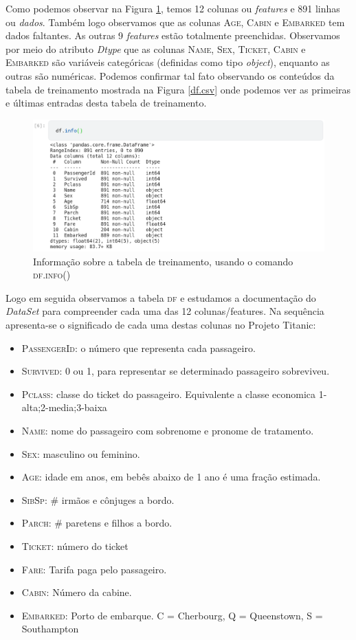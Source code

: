 \documentclass{article}
\begin{document}
Como podemos observar na Figura \ref{df.info}, temos 12 colunas ou \emph{features} e 891 linhas ou \emph{dados}. Também logo observamos que as colunas \textsc{Age, Cabin} e \textsc{Embarked} tem dados faltantes. As outras 9 \emph{features} estão totalmente preenchidas. 
Observamos por meio do atributo \emph{Dtype} que as colunas \textsc{Name, Sex, Ticket, Cabin} e \textsc{Embarked} são variáveis categóricas (definidas como tipo \emph{object}), enquanto as outras são numéricas. Podemos confirmar tal fato observando os conteúdos da tabela de treinamento mostrada na Figura \ref{df.csv} onde podemos ver as primeiras e últimas entradas desta tabela de treinamento.
\begin{figure}[H]
\centering
\includegraphics[width=\textwidth]{Figures/df.info().png}
\caption{\label{df.info}Informação sobre a tabela de treinamento, usando o comando \textsc{df.info()}}
\end{figure}

Logo em seguida observamos a tabela \textsc{df} e estudamos a documentação do \emph{DataSet} para compreender cada uma das 12 colunas/features. Na sequência apresenta-se o significado de cada uma destas colunas no Projeto Titanic:
\begin{itemize}
\item \textsc{PassengerId}: o número que representa cada passageiro. 
\item \textsc{Survived}: 0 ou 1, para representar se determinado passageiro sobreviveu.
\item \textsc{Pclass}: classe do ticket do passageiro. Equivalente a classe economica 1-alta;2-media;3-baixa
\item \textsc{Name}: nome do passageiro com sobrenome e pronome de tratamento. 
\item \textsc{Sex}: masculino ou feminino. 
\item \textsc{Age}: idade em anos, em bebês abaixo de 1 ano é uma fração estimada. 
\item \textsc{SibSp}: \# irmãos e cônjuges a bordo.
\item \textsc{Parch}: \# paretens e filhos a bordo. 
\item \textsc{Ticket}: número do ticket
\item \textsc{Fare}: Tarifa paga pelo passageiro. 
\item \textsc{Cabin}: Número da cabine. 
\item \textsc{Embarked}: Porto de embarque. C = Cherbourg, Q = Queenstown, S = Southampton
\end{itemize}
\end{document}
